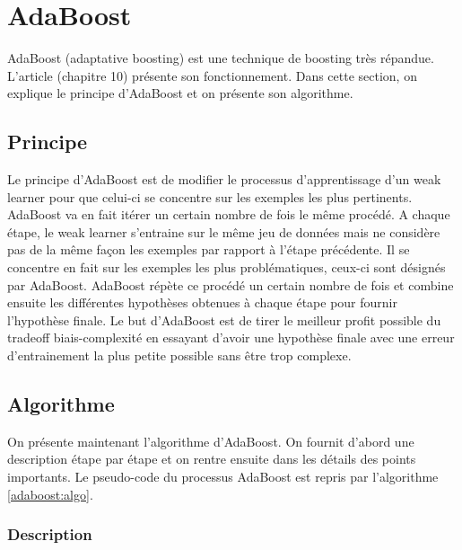 \documentclass[12pt]{article}
\begin{document}
	\renewcommand{\labelitemi}{$\bullet$}
	\section{AdaBoost}
	
	AdaBoost (adaptative boosting) est une technique de boosting très répandue. L'article \cite{Bousquet2003-oz} (chapitre 10) présente son fonctionnement. Dans cette section, on explique le principe d'AdaBoost et on présente son algorithme.  
	
	\subsection{Principe}
	
	Le principe d'AdaBoost est de modifier le processus d'apprentissage d'un weak learner pour que celui-ci se concentre sur les exemples les plus pertinents. AdaBoost va en fait itérer un certain nombre de fois le même procédé. A chaque étape, le weak learner s'entraine sur le même jeu de données mais ne considère pas de la même façon les exemples par rapport à l'étape précédente. Il se concentre en fait sur les exemples les plus problématiques, ceux-ci sont désignés par AdaBoost. AdaBoost répète ce procédé un certain nombre de fois et combine ensuite les différentes hypothèses obtenues à chaque étape pour fournir l'hypothèse finale. Le but d'AdaBoost est de tirer le meilleur profit possible du tradeoff biais-complexité en essayant d'avoir une hypothèse finale avec une erreur d'entrainement la plus petite possible sans être trop complexe.
	
	\subsection{Algorithme}
	
	On présente maintenant l'algorithme d'AdaBoost. On fournit d'abord une description étape par étape et on rentre ensuite dans les détails des points importants. Le pseudo-code du processus AdaBoost est repris par l'algorithme \ref{adaboost:algo}.
	
	\subsubsection{Description}
	
\end{document}

